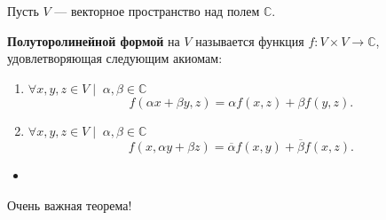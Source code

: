 \documentclass[12px]{report}
\begin{document}
\clearpage

Пусть $V$ — векторное пространство над полем $\mathbb{C}$.
\vspace{0.5cm}
\begin{shdef}
    \begin{definition}
    \leavevmode \newline
    
    \textbf{Полуторолинейной формой} на $V$ называется функция \newline $f: V \times V \to \mathbb{C}$, удовлетворяющая следующим акиомам:
        \begin{enumerate}
    \item $\forall x,y,z \in V \mid \; \alpha, \beta \in \mathbb{C}$
    \[
    f(\alpha x + \beta y, z) = \alpha f(x, z) + \beta f(y, z).
    \]
    \item $\forall x, y, z \in V \mid \; \alpha, \beta \in \mathbb{C}$
    \[
    f(x, \alpha y + \beta z) = \overline{\alpha} f(x, y) + \overline{\beta} f(x, z).
    \]
        \end{enumerate}
    \end{definition}
\end{shdef}



\begin{itemize}
    \item 
\end{itemize}

\begin{shth}
\begin{theorem}
    Очень важная теорема!
\end{theorem}
\end{shth}



\clearpage
\end{document}
